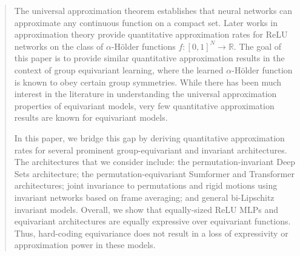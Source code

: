 \documentclass[twoside,11pt]{article}
\begin{document}
\begin{abstract}
The universal approximation theorem establishes that neural networks can approximate any continuous function on a compact set. Later works in approximation theory provide quantitative approximation rates for ReLU networks on the class of $\alpha$-Hölder functions $f: [0,1]^N \to \mathbb{R}$. The goal of this paper is to provide similar quantitative approximation results in the context of group equivariant learning, where the learned $\alpha$-Hölder function is known to obey certain group symmetries. While there has been much interest in the literature in understanding the universal approximation properties of equivariant models, very few quantitative approximation results are known for equivariant models. 

In this paper, we bridge this gap by deriving quantitative approximation rates for several prominent group-equivariant and invariant architectures. The architectures that we consider include: the permutation-invariant Deep Sets architecture; the permutation-equivariant Sumformer and Transformer architectures; joint invariance to permutations and rigid motions using invariant networks based on frame averaging; and general bi-Lipschitz invariant models. Overall, we show that equally-sized ReLU MLPs and equivariant architectures are equally  expressive over equivariant functions. Thus, hard-coding equivariance does not result in a loss of expressivity or approximation power in these models.



\end{abstract}
\end{document}
